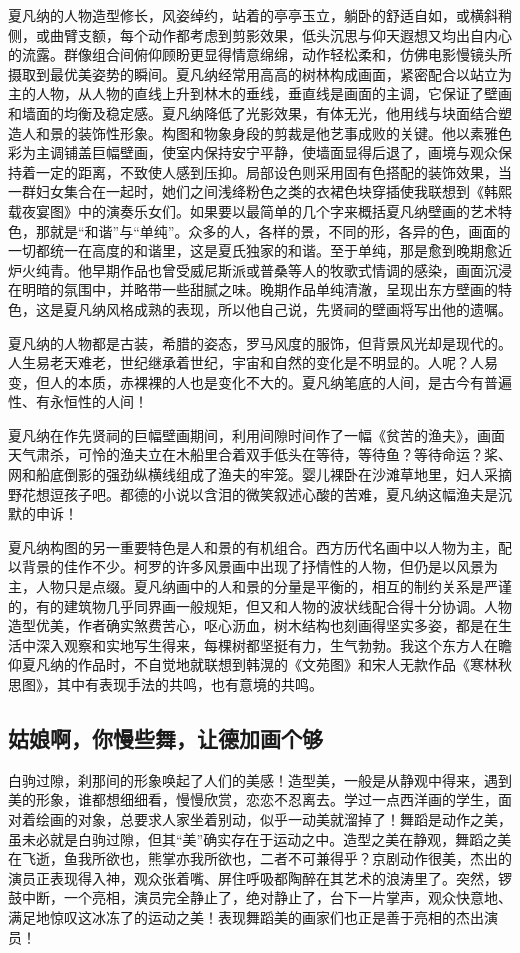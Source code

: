 \documentclass{article}
\begin{document}
夏凡纳的人物造型修长，风姿绰约，站着的亭亭玉立，躺卧的舒适自如，或横斜稍侧，或曲臂支额，每个动作都考虑到剪影效果，低头沉思与仰天遐想又均出自内心的流露。群像组合间俯仰顾盼更显得情意绵绵，动作轻松柔和，仿佛电影慢镜头所摄取到最优美姿势的瞬间。夏凡纳经常用高高的树林构成画面，紧密配合以站立为主的人物，从人物的直线上升到林木的垂线，垂直线是画面的主调，它保证了壁画和墙面的均衡及稳定感。夏凡纳降低了光影效果，有体无光，他用线与块面结合塑造人和景的装饰性形象。构图和物象身段的剪裁是他艺事成败的关键。他以素雅色彩为主调铺盖巨幅壁画，使室内保持安宁平静，使墙面显得后退了，画境与观众保持着一定的距离，不致使人感到压抑。局部设色则采用固有色搭配的装饰效果，当一群妇女集合在一起时，她们之间浅绛粉色之类的衣裙色块穿插使我联想到《韩熙载夜宴图》中的演奏乐女们。如果要以最简单的几个字来概括夏凡纳壁画的艺术特色，那就是“和谐”与“单纯”。众多的人，各样的景，不同的形，各异的色，画面的一切都统一在高度的和谐里，这是夏氏独家的和谐。至于单纯，那是愈到晚期愈近炉火纯青。他早期作品也曾受威尼斯派或普桑等人的牧歌式情调的感染，画面沉浸在明暗的氛围中，并略带一些甜腻之味。晚期作品单纯清澈，呈现出东方壁画的特色，这是夏凡纳风格成熟的表现，所以他自己说，先贤祠的壁画将写出他的遗嘱。

夏凡纳的人物都是古装，希腊的姿态，罗马风度的服饰，但背景风光却是现代的。人生易老天难老，世纪继承着世纪，宇宙和自然的变化是不明显的。人呢？人易变，但人的本质，赤裸裸的人也是变化不大的。夏凡纳笔底的人间，是古今有普遍性、有永恒性的人间！

夏凡纳在作先贤祠的巨幅壁画期间，利用间隙时间作了一幅《贫苦的渔夫》，画面天气肃杀，可怜的渔夫立在木船里合着双手低头在等待，等待鱼？等待命运？桨、网和船底倒影的强劲纵横线组成了渔夫的牢笼。婴儿裸卧在沙滩草地里，妇人采摘野花想逗孩子吧。都德的小说以含泪的微笑叙述心酸的苦难，夏凡纳这幅渔夫是沉默的申诉！

夏凡纳构图的另一重要特色是人和景的有机组合。西方历代名画中以人物为主，配以背景的佳作不少。柯罗的许多风景画中出现了抒情性的人物，但仍是以风景为主，人物只是点缀。夏凡纳画中的人和景的分量是平衡的，相互的制约关系是严谨的，有的建筑物几乎同界画一般规矩，但又和人物的波状线配合得十分协调。人物造型优美，作者确实煞费苦心，呕心沥血，树木结构也刻画得坚实多姿，都是在生活中深入观察和实地写生得来，每棵树都坚挺有力，生气勃勃。我这个东方人在瞻仰夏凡纳的作品时，不自觉地就联想到韩滉的《文苑图》和宋人无款作品《寒林秋思图》，其中有表现手法的共鸣，也有意境的共鸣。
\subsection{姑娘啊，你慢些舞，让德加画个够}
白驹过隙，刹那间的形象唤起了人们的美感！造型美，一般是从静观中得来，遇到美的形象，谁都想细细看，慢慢欣赏，恋恋不忍离去。学过一点西洋画的学生，面对着绘画的对象，总要求人家坐着别动，似乎一动美就溜掉了！舞蹈是动作之美，虽未必就是白驹过隙，但其“美”确实存在于运动之中。造型之美在静观，舞蹈之美在飞逝，鱼我所欲也，熊掌亦我所欲也，二者不可兼得乎？京剧动作很美，杰出的演员正表现得入神，观众张着嘴、屏住呼吸都陶醉在其艺术的浪涛里了。突然，锣鼓中断，一个亮相，演员完全静止了，绝对静止了，台下一片掌声，观众快意地、满足地惊叹这冰冻了的运动之美！表现舞蹈美的画家们也正是善于亮相的杰出演员！
\end{document}
